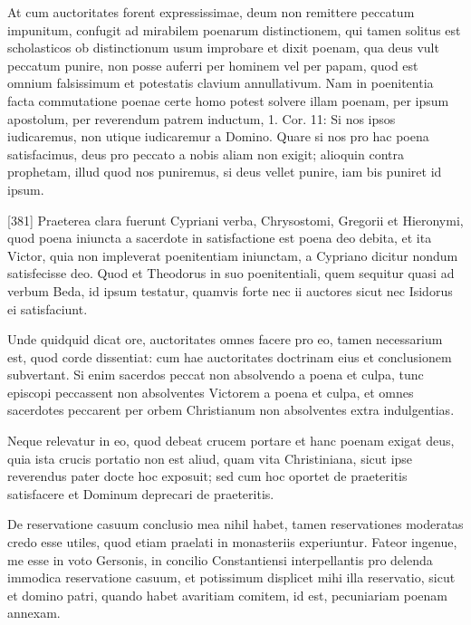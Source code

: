 At cum auctoritates forent expressissimae, deum non remittere peccatum impunitum, confugit ad mirabilem poenarum distinctionem, qui tamen solitus est scholasticos ob distinctionum usum improbare et dixit poenam, qua deus vult peccatum punire, non posse auferri per hominem vel per papam, quod est omnium falsissimum et potestatis clavium annullativum. Nam in poenitentia facta commutatione poenae certe homo potest solvere illam poenam, per ipsum apostolum, per reverendum patrem inductum, 1. Cor. 11: Si nos ipsos iudicaremus, non utique iudicaremur a Domino. Quare si nos pro hac poena satisfacimus, deus pro peccato a nobis aliam non exigit; alioquin contra prophetam, illud quod nos puniremus, si deus vellet punire, iam bis puniret id ipsum.

[381] Praeterea clara fuerunt Cypriani verba, Chrysostomi, Gregorii et Hieronymi, quod poena iniuncta a sacerdote in satisfactione est poena deo debita, et ita Victor, quia non impleverat poenitentiam iniunctam, a Cypriano dicitur nondum satisfecisse deo. Quod et Theodorus in suo poenitentiali, quem sequitur quasi ad verbum Beda, id ipsum testatur, quamvis forte nec ii auctores sicut nec Isidorus ei satisfaciunt.

Unde quidquid dicat ore, auctoritates omnes facere pro eo, tamen necessarium est, quod corde dissentiat: cum hae auctoritates doctrinam eius et conclusionem subvertant. Si enim sacerdos peccat non absolvendo a poena et culpa, tunc episcopi peccassent non absolventes Victorem a poena et culpa, et omnes sacerdotes peccarent per orbem Christianum non absolventes extra indulgentias.

Neque relevatur in eo, quod debeat crucem portare et hanc poenam exigat deus, quia ista crucis portatio non est aliud, quam vita Christiniana, sicut ipse reverendus pater docte hoc exposuit; sed cum hoc oportet de praeteritis satisfacere et Dominum deprecari de praeteritis.

De reservatione casuum conclusio mea nihil habet, tamen reservationes moderatas credo esse utiles, quod etiam praelati in monasteriis experiuntur. Fateor ingenue, me esse in voto Gersonis, in concilio Constantiensi interpellantis pro delenda immodica reservatione casuum, et potissimum displicet mihi illa reservatio, sicut et domino patri, quando habet avaritiam comitem, id est, pecuniariam poenam annexam.

